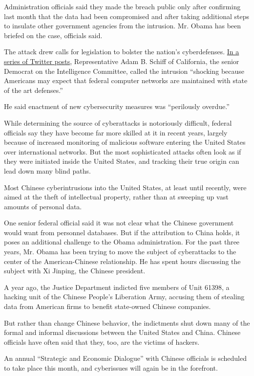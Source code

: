 Administration officials said they made the breach public only after
confirming last month that the data had been compromised and after
taking additional steps to insulate other government agencies from the
intrusion. Mr. Obama has been briefed on the case, officials said.

The attack drew calls for legislation to bolster the nation's
cyberdefenses. \href{https://twitter.com/repadamschiff}{In a series of
Twitter posts}, Representative Adam B. Schiff of California, the senior
Democrat on the Intelligence Committee, called the intrusion ``shocking
because Americans may expect that federal computer networks are
maintained with state of the art defenses.''

He said enactment of new cybersecurity measures was ``perilously
overdue.''

While determining the source of cyberattacks is notoriously difficult,
federal officials say they have become far more skilled at it in recent
years, largely because of increased monitoring of malicious software
entering the United States over international networks. But the most
sophisticated attacks often look as if they were initiated inside the
United States, and tracking their true origin can lead down many blind
paths.

Most Chinese cyberintrusions into the United States, at least until
recently, were aimed at the theft of intellectual property, rather than
at sweeping up vast amounts of personal data.

One senior federal official said it was not clear what the Chinese
government would want from personnel databases. But if the attribution
to China holds, it poses an additional challenge to the Obama
administration. For the past three years, Mr. Obama has been trying to
move the subject of cyberattacks to the center of the American-Chinese
relationship. He has spent hours discussing the subject with Xi Jinping,
the Chinese president.

A year ago, the Justice Department indicted five members of Unit 61398,
a hacking unit of the Chinese People's Liberation Army, accusing them of
stealing data from American firms to benefit state-owned Chinese
companies.

But rather than change Chinese behavior, the indictments shut down many
of the formal and informal discussions between the United States and
China. Chinese officials have often said that they, too, are the victims
of hackers.

An annual ``Strategic and Economic Dialogue'' with Chinese officials is
scheduled to take place this month, and cyberissues will again be in the
forefront.

